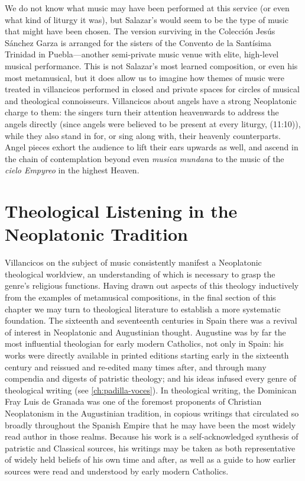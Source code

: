We do not know what music may have been performed at this service (or even what
kind of liturgy it was), but Salazar's  would seem to
be the type of music that might have been chosen.
The version surviving in the Colección Jesús Sánchez Garza is arranged for the
sisters of the Convento de la Santísima Trinidad in Puebla---another
semi-private music venue with elite, high-level musical performance.
This is not Salazar's most learned composition, or even his most metamusical,
but it does allow us to imagine how themes of music were treated in villancicos
performed in closed and private spaces for circles of musical and theological
connoisseurs.
Villancicos about angels have a strong Neoplatonic charge to them: the singers
turn their attention heavenwards to address the angels directly (since angels
were believed to be present at every liturgy, (11:10)), while
they also stand in for, or sing along with, their heavenly counterparts.
Angel pieces exhort the audience to lift their ears upwards as well, and ascend
in the chain of contemplation beyond even \emph{musica mundana} to the music of
the \emph{cielo Empyreo} in the highest Heaven.

\section{Theological Listening in the Neoplatonic Tradition}


Villancicos on the subject of music consistently manifest a Neoplatonic
theological worldview, an understanding of which is necessary to grasp the
genre's religious functions.
Having drawn out aspects of this theology inductively from the examples of
metamusical compositions, in the final section of this chapter we may turn to
theological literature to establish a more systematic foundation.
The sixteenth and seventeenth centuries in Spain there was a revival of
interest in Neoplatonic and Augustinian thought.%
    \citXXX[revivals]
Augustine was by far the most influential theologian for early modern
Catholics, not only in Spain: his works were directly available in printed
editions starting early in the sixteenth century and reissued and re-edited
many times after, and through many compendia and digests of patristic theology;
and his ideas infused every genre of theological writing (see
\cref{ch:padilla-voces}).
In theological writing, the Dominican Fray Luis de Granada was one of the
foremost proponents of Christian Neoplatonism in the Augustinian tradition, in
copious writings that circulated so broadly throughout the Spanish Empire that
he may have been the most widely read author in those realms.%
    \citXXX[readership]
Because his work is a self-acknowledged synthesis of patristic and Classical
sources, his writings may be taken as both representative of widely held
beliefs of his own time and after, as well as a guide to how earlier sources
were read and understood by early modern Catholics.

